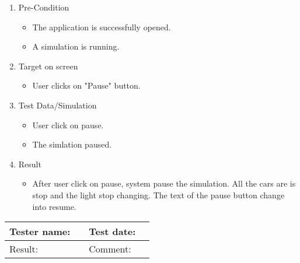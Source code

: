\begin{enumerate}
	\item Pre-Condition
	\begin{itemize}
		\item The application is successfully opened.
		\item A simulation is running.
	\end{itemize}
	\item Target on screen
	\begin{itemize}
		\item User clicks on "Pause" button.
	\end{itemize}
	\item Test Data/Simulation
	\begin{itemize}
		\item User click on pause.
		\item The simlation paused.
	\end{itemize}
	\item Result
	\begin{itemize}
		\item After user click on pause, system pause the simulation. All the cars are is stop and the light stop changing. The text of the pause button change into resume.
	\end{itemize}
\end{enumerate}

\begin{tabularx}{\textwidth}{|p{3cm}X|p{3cm}X|}\hline
	Tester name: &  & Test date: & \\\hline
	Result: &  \pass & Comment: & \\\hline
\end{tabularx}





